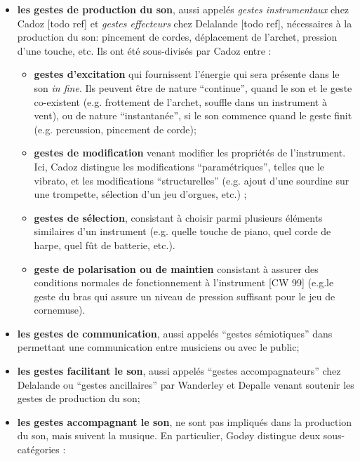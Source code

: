 \vspace{-1em}
\begin{itemize}[noitemsep]
\item \textbf{les gestes de production du son}, aussi appelés \textit{gestes instrumentaux} chez Cadoz [todo ref] et \textit{gestes effecteurs} chez Delalande [todo ref], nécessaires à la production du son: pincement de cordes, déplacement de l'archet, pression d'une touche, etc. Ils ont été sous-divisés par Cadoz \cite{cadoz_instrumental_1988} entre :
	\vspace{-1em}
	\begin{itemize}[noitemsep]
		\item \textbf{gestes d'excitation} qui fournissent l'énergie qui sera présente dans le son \textit{in fine}. Ils peuvent être de nature ``continue'', quand le son et le geste co-existent (e.g. frottement de l'archet, souffle dans un instrument à vent), ou de nature ``instantanée'', si le son commence quand le geste finit (e.g. percussion, pincement de corde);
		\item \textbf{gestes de modification} venant modifier les propriétés de l'instrument. Ici, Cadoz distingue les modifications ``paramétriques'', telles que le vibrato, et les modifications ``structurelles'' (e.g. ajout d'une sourdine sur une trompette, sélection d'un jeu d'orgues, etc.) ;
		\item \textbf{gestes de sélection}, consistant à choisir parmi plusieurs éléments similaires d'un instrument (e.g. quelle touche de piano, quel corde de harpe, quel fût de batterie, etc.).
		\item \textbf{geste de polarisation ou de maintien} consistant à assurer des conditions normales de fonctionnement à l'instrument [CW 99] (e.g.le geste du bras qui assure un niveau de pression suffisant pour le jeu de cornemuse).
	\end{itemize}
\item \textbf{les gestes de communication}, aussi appelés ``gestes sémiotiques'' dans \cite{cadoz_gesture_2000} permettant une communication entre musiciens ou avec le public;
\item \textbf{les gestes facilitant le son}, aussi appelés ``gestes accompagnateurs'' chez Delalande \cite{delalande_geste_1988} ou ``gestes ancillaires'' par Wanderley et Depalle \cite{wanderley_gestural_2004} venant soutenir les gestes de production du son;
\item \textbf{les gestes accompagnant le son}, ne sont pas impliqués dans la production du son, mais suivent la musique. En particulier, Godøy distingue deux sous-catégories :

\end{itemize}
